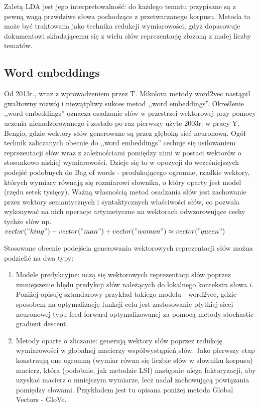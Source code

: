 \documentclass[pl]{minipw} %
\begin{document}
Zaletą LDA jest jego interpretowalność: do każdego tematu przypisane są z pewną wagą przwdziwe słowa pochodzące z przetwarzanego korpusu. Metoda ta może być traktowana jako technika redukcji wymiarowości, gdyż dopasowuje dokumentowi składającemu się z wielu słów reprezentację złożoną z małej liczby tematów.


\subsection{Word embeddings}
Od 2013r., wraz z wprowadzeniem przez T. Mikolova metody word2vec\cite{word2vec} nastąpił gwałtowny rozwój i niewątpliwy sukces metod ,,word embeddings''. Określenie ,,word embeddings'' oznacza osadzanie słów w przestrzei wektorowej przy pomocy uczenia nienadzorowanego i zostało po raz pierwszy użyte 2003r. w pracy Y. Bengio\cite{bengio}, gdzie wektory słów generowane są przez głęboką sieć neuronową. Ogół technik zaliczanych obecnie do ,,word embeddings'' cechuje się usiłowaniem reprezentacji słów wraz z zależnościami pomiędzy nimi w postaci wektorów o stosunkowo niskiej wymiarowości. Dzieje się to w opozycji do wcześniejszych podejść podobnych do Bag of words - produkującego ogromne, rzadkie wektory, których wymiary równają się rozmiarowi słownika, o który oparty jest model (rzędu setek tysięcy). Ważną własnością metod osadzania słów jest zachowanie przez wektory semantycznych i syntaktycznych właściwości słów, co pozwala wykonywać na nich operacje artymetyczne na wektorach odwzorowujące cechy tychże słów np. $vector("king")-vector("man")+vector("woman") \approx vector("queen")$ 

Stosowane obecnie podejścia generowania wektorowych reprezentacji słów można podzielić na dwa typy:
\begin{enumerate}
	\item Modele predykcyjne: uczą się wektorowych reprezentacji słów poprzez zmniejszenie błędu predykcji słów należących do lokalnego kontekstu słowa $i$. Poniżej opisuję sztandarowy przykład takiego modelu - word2vec, gdzie sposobem na optymalizację funkcji celu jest zastosowanie płytkiej sieci neuronowej typu feed-forward optymalizowanej za pomocą metody stochastic gradient descent.
	\item Metody oparte o zliczanie: generują wektory słów poprzez redukcję wymiarowości w globalnej macierzy współwystąpień słów.
	Jako pierwszy etap konstruują one ogromną (wymiar równa się liczbie słów w słowniku korpusu) macierz, która (podobnie, jak  metodzie LSI) następnie ulega faktoryzacji, aby uzyskać macierz o mniejszym wymiarze, lecz nadal zachowującą powiązania pomiędzy słowami. Przykładem jest tu opisana poniżej metoda Global Vectors - GloVe.
\end{enumerate}
\end{document}
